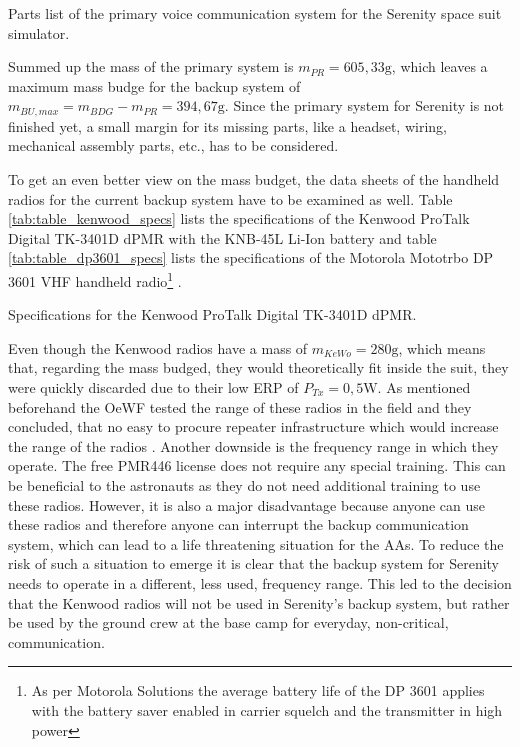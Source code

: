 \vfill%
\begin{table}[h!]
	\centering
	
	\caption{Parts list of the primary voice communication system for the Serenity space suit simulator.}
	\label{tab:table_primary_comm_system_parts_list}
\end{table}
\vfill%

Summed up the mass of the primary system is $m_{PR} = 605,33\mathrm{g}$, which leaves a maximum mass budge for the backup system of $m_{BU, max} = m_{BDG} - m_{PR} = 394,67\mathrm{g}$. Since the primary system for Serenity is not finished yet, a small margin for its missing parts, like a headset, wiring, mechanical assembly parts, etc., has to be considered. 

To get an even better view on the mass budget, the data sheets of the handheld radios for the current backup system have to be examined as well. Table \ref{tab:table_kenwood_specs} lists the specifications of the Kenwood ProTalk Digital TK-3401D dPMR with the KNB-45L Li-Ion battery and table \ref{tab:table_dp3601_specs} lists the specifications of the Motorola Mototrbo DP 3601 VHF handheld radio\footnote{As per Motorola Solutions the average battery life of the DP 3601 applies with the battery saver enabled in carrier squelch and the transmitter in high power} \cite{DP3601:2010, Kenwood:2014, Groemer:2020}.

\vfill%
\begin{table}[h!]
	\centering
	
	\caption{Specifications for the Kenwood ProTalk Digital TK-3401D dPMR.}
	\label{tab:table_kenwood_specs}
\end{table}
\vfill%

Even though the Kenwood radios have a mass of $m_{KeWo} = 280\mathrm{g}$, which means that, regarding the mass budged, they would theoretically fit inside the suit, they were quickly discarded due to their low ERP of $P_{Tx} = 0,5\mathrm{W}$. As mentioned beforehand the OeWF tested the range of these radios in the field and they concluded,  that no easy to procure repeater infrastructure which would increase the range of the radios \cite{Groemer:2020}. Another downside is the frequency range in which they operate. The free PMR446 license does not require any special training. This can be beneficial to the astronauts as they do not need additional training to use these radios. However, it is also a major disadvantage because anyone can use these radios and therefore anyone can interrupt the backup communication system, which can lead to a life threatening situation for the AAs. To reduce the risk of such a situation to emerge it is clear that the backup system for Serenity needs to operate in a different, less used, frequency range. This led to the decision that the Kenwood radios will not be used in Serenity's backup system, but rather be used by the ground crew at the base camp for everyday, non-critical, communication.

